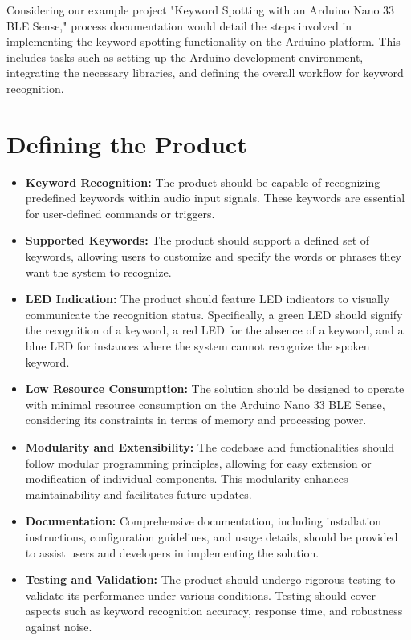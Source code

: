 Considering our example project "Keyword Spotting with an Arduino Nano 33 BLE Sense," process documentation would detail the steps involved in implementing the keyword spotting functionality on the Arduino platform. This includes tasks such as setting up the Arduino development environment, integrating the necessary libraries, and defining the overall workflow for keyword recognition.


\section{Defining the Product}

\begin{itemize}
	\item \textbf{Keyword Recognition:} The product should be capable of recognizing predefined keywords within audio input signals. These keywords are essential for user-defined commands or triggers.
	
	\item \textbf{Supported Keywords:} The product should support a defined set of keywords, allowing users to customize and specify the words or phrases they want the system to recognize.
	
	\item \textbf{LED Indication:} The product should feature LED indicators to visually communicate the recognition status. Specifically, a green LED should signify the recognition of a keyword, a red LED for the absence of a keyword, and a blue LED for instances where the system cannot recognize the spoken keyword.
	
	\item \textbf{Low Resource Consumption:} The solution should be designed to operate with minimal resource consumption on the Arduino Nano 33 BLE Sense, considering its constraints in terms of memory and processing power.
	
	\item \textbf{Modularity and Extensibility:} The codebase and functionalities should follow modular programming principles, allowing for easy extension or modification of individual components. This modularity enhances maintainability and facilitates future updates.
	
	\item \textbf{Documentation:} Comprehensive documentation, including installation instructions, configuration guidelines, and usage details, should be provided to assist users and developers in implementing the solution.
	
	\item \textbf{Testing and Validation:} The product should undergo rigorous testing to validate its performance under various conditions. Testing should cover aspects such as keyword recognition accuracy, response time, and robustness against noise.
\end{itemize}



